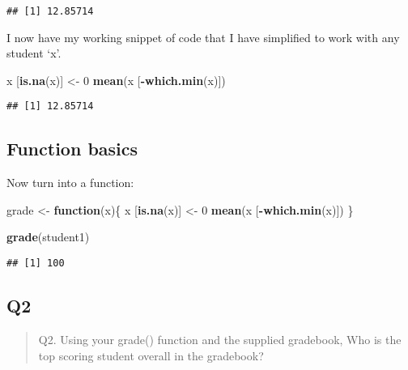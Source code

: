 \documentclass[
]{article}
\newenvironment{Shaded}{\begin{snugshade}}{\end{snugshade}}
\newcommand{\ControlFlowTok}[1]{\textcolor[rgb]{0.13,0.29,0.53}{\textbf{#1}}}
\newcommand{\DecValTok}[1]{\textcolor[rgb]{0.00,0.00,0.81}{#1}}
\newcommand{\KeywordTok}[1]{\textcolor[rgb]{0.13,0.29,0.53}{\textbf{#1}}}
\newcommand{\NormalTok}[1]{#1}
\newcommand{\OperatorTok}[1]{\textcolor[rgb]{0.81,0.36,0.00}{\textbf{#1}}}
\newcommand{\StringTok}[1]{\textcolor[rgb]{0.31,0.60,0.02}{#1}}
\begin{document}
\begin{verbatim}
## [1] 12.85714
\end{verbatim}

I now have my working snippet of code that I have simplified to work
with any student `x'.

\begin{Shaded}
\begin{Highlighting}[]
\NormalTok{x [}\KeywordTok{is.na}\NormalTok{(x)] <-}\StringTok{ }\DecValTok{0}
\KeywordTok{mean}\NormalTok{(x [}\OperatorTok{-}\KeywordTok{which.min}\NormalTok{(x)])}
\end{Highlighting}
\end{Shaded}

\begin{verbatim}
## [1] 12.85714
\end{verbatim}

\hypertarget{function-basics}{%
\subsection{Function basics}\label{function-basics}}

Now turn into a function:

\begin{Shaded}
\begin{Highlighting}[]
\NormalTok{grade <-}\StringTok{ }\ControlFlowTok{function}\NormalTok{(x)\{}
\NormalTok{  x [}\KeywordTok{is.na}\NormalTok{(x)] <-}\StringTok{ }\DecValTok{0}
  \KeywordTok{mean}\NormalTok{(x [}\OperatorTok{-}\KeywordTok{which.min}\NormalTok{(x)])}
\NormalTok{\}}
\end{Highlighting}
\end{Shaded}

\begin{Shaded}
\begin{Highlighting}[]
\KeywordTok{grade}\NormalTok{(student1)}
\end{Highlighting}
\end{Shaded}

\begin{verbatim}
## [1] 100
\end{verbatim}

\hypertarget{q2}{%
\subsection{Q2}\label{q2}}

\begin{quote}
Q2. Using your grade() function and the supplied gradebook, Who is the
top scoring student overall in the gradebook?
\end{quote}
\end{document}
